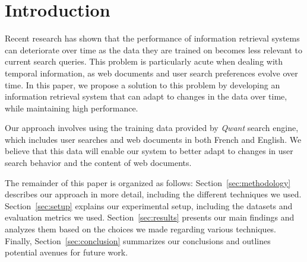 \enlargethispage{2\baselineskip}
\section{Introduction}
\label{sec:introduction}

Recent research has shown that the performance of information retrieval systems can deteriorate over time as the data they are trained on becomes less relevant to current search queries. 
This problem is particularly acute when dealing with temporal information, as web documents and user search preferences evolve over time. 
In this paper, we propose a solution to this problem by developing an information retrieval system that can adapt to changes in the data over time, while maintaining high performance.

Our approach involves using the training data provided by \textit{Qwant} \cite{qwant} search engine, which includes user searches and web documents in both French and English. 
We believe that this data will enable our system to better adapt to changes in user search behavior and the content of web documents.

The remainder of this paper is organized as follows: 
Section~\ref{sec:methodology} describes our approach in more detail, including the different techniques we used. 
Section~\ref{sec:setup} explains our experimental setup, including the datasets and evaluation metrics we used. 
Section~\ref{sec:results} presents our main findings and analyzes them based on the choices we made regarding various techniques. 
Finally, Section~\ref{sec:conclusion} summarizes our conclusions and outlines potential avenues for future work.